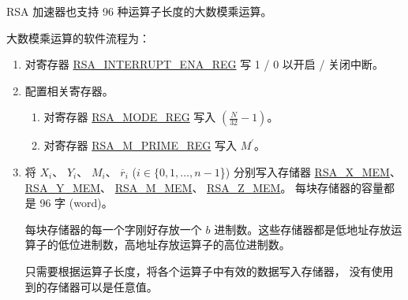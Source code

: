 \documentclass[main\_\_CN.tex]{subfiles}
\begin{document}
RSA 加速器也支持 96 种运算子长度的大数模乘运算。

大数模乘运算的软件流程为：

\begin{enumerate}

    \item 对寄存器 \hyperref[regdesc:RSAINTERRUPTENAREG]{RSA\_INTERRUPT\_ENA\_REG} 写 1 / 0 以开启 / 关闭中断。
    
    \item 配置相关寄存器。
    
    \begin{enumerate}
        \item 对寄存器 \hyperref[regdesc:RSAMODEXPMODEREG]{RSA\_MODE\_REG} 写入 \begin{math}( \frac{N}{32} - 1 )\end{math}。
        
        \item 对寄存器 \hyperref[regdesc:RSAMPRIMEREG]{RSA\_M\_PRIME\_REG} 写入 \begin{math}M^{\prime}\end{math}。
        
    \end{enumerate}

    \item 将
        \begin{math}X_{i}\end{math}、
        \begin{math}Y_{i}\end{math}、
        \begin{math}M_{i}\end{math}、
        \begin{math}\overline{r}_{i}\end{math}
        (\begin{math}i \in \{0, 1, \dots, n-1\end{math}\})
        分别写入存储器 
        \hyperref[regdesc:RSAmemory]{RSA\_X\_MEM}、
        \hyperref[regdesc:RSAmemory]{RSA\_Y\_MEM}、
        \hyperref[regdesc:RSAmemory]{RSA\_M\_MEM}、
        \hyperref[regdesc:RSAmemory]{RSA\_Z\_MEM}。
        每块存储器的容量都是 96 字 (word)。
        
        每块存储器的每一个字刚好存放一个 \begin{math}b\end{math} 进制数。这些存储器都是低地址存放运算子的低位进制数，高地址存放运算子的高位进制数。
        
        只需要根据运算子长度，将各个运算子中有效的数据写入存储器，
        没有使用到的存储器可以是任意值。


\end{enumerate}
\end{document}
